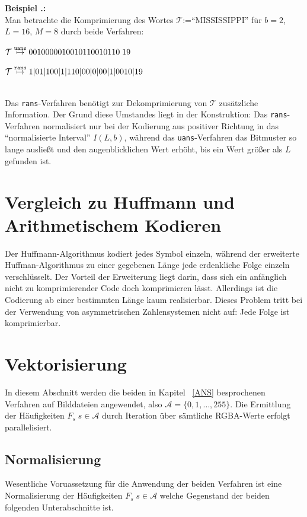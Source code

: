 \documentclass[a4paper,12pt]{article}
\newcommand{\A}{\mathcal A}
\newcounter{Beispiel}
\newcounter{Algorithmus}
\newenvironment{Beispiel}{
\medskip
        
        \setlength{\parindent}{0pt}
        \addtocounter{Beispiel}{1}
        \textbf{\textsf{Beispiel \thesubsection.\theBeispiel}:}\\}{
        \nopagebreak
        \vspace{-1.0ex}
        \bigskip
        
}
\begin{document}
\begin{Beispiel}
Man betrachte die Komprimierung des Wortes $\mathcal{T}$:="`MISSISSIPPI"'  für $b=2$, $L=16$, $M=8$ durch beide Verfahren:
\par
\vspace{0.5cm}
\begin{minipage}[h]{.5\textwidth}
$\mathcal{T}\stackrel{{\tt{uans}}}{\mapsto} 0010000010010110010110\;19$
\end{minipage}
\hfill
 \begin{minipage}[h]{.5\textwidth}
$\mathcal{T}\stackrel{{\tt{rans}}}{\mapsto} 1|01|100|1|110|00|0|00|1|0010|19$
\end{minipage}   
\vspace{0.5cm}
\\
Das {\tt{rans}}-Verfahren benötigt zur Dekomprimierung von $\mathcal{T}$ zusätzliche Information. Der Grund diese Umstandes liegt in der Konstruktion: Das {\tt{rans}}-Verfahren normalisiert nur bei der Kodierung aus positiver Richtung in das "`normalisierte Interval"' $I(L,b)$, während das {\tt{uans}}-Verfahren das Bitmuster so lange ausließt und den augenblicklichen Wert erhöht, bis ein Wert größer als $L$ gefunden ist.
\end{Beispiel}

\section{Vergleich zu Huffmann und Arithmetischem Kodieren}
Der Huffmann-Algorithmus kodiert jedes Symbol einzeln, während der erweiterte Huffman-Algorithmus zu einer gegebenen Länge jede erdenkliche Folge einzeln verschlüsselt. Der Vorteil der Erweiterung liegt darin, dass sich ein anfänglich nicht zu komprimierender Code doch komprimieren lässt. Allerdings ist die Codierung ab einer bestimmten Länge kaum realisierbar. Dieses Problem tritt bei der Verwendung von asymmetrischen Zahlensystemen nicht auf: Jede Folge ist komprimierbar.

\newpage
\section{Vektorisierung}
In diesem Abschnitt werden die beiden in Kapitel ~\ref{ANS} besprochenen Verfahren auf Bilddateien angewendet, also 
 $\A=\{0,1,\ldots,255\}$. Die Ermittlung der Häufigkeiten $F_{s}\;s\in\A$ durch Iteration über sämtliche RGBA-Werte erfolgt parallelisiert. 
\subsection{Normalisierung}
Wesentliche Voruassetzung für die Anwendung der beiden Verfahren ist eine Normalisierung der Häufigkeiten $F_{s}\;s\in\A$ welche Gegenstand der beiden folgenden Unterabschnitte ist.
\end{document}
